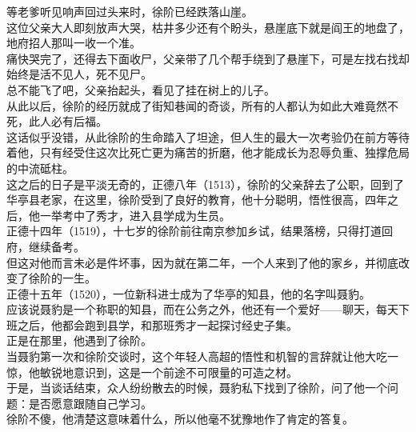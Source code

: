 \begin{multicols}{\theparacolNo}
等老爹听见响声回过头来时，徐阶已经跌落山崖。\\

这位父亲大人即刻放声大哭，枯井多少还有个盼头，悬崖底下就是阎王的地盘了，地府招人那叫一收一个准。\\

痛快哭完了，还得去下面收尸，父亲带了几个帮手绕到了悬崖下，可是左找右找却始终是活不见人，死不见尸。\\

总不能飞了吧，父亲抬起头，看见了挂在树上的儿子。\\

从此以后，徐阶的经历就成了街知巷闻的奇谈，所有的人都认为如此大难竟然不死，此人必有后福。\\

这话似乎没错，从此徐阶的生命踏入了坦途，但人生的最大一次考验仍在前方等待着他，只有经受住这次比死亡更为痛苦的折磨，他才能成长为忍辱负重、独撑危局的中流砥柱。\\

这之后的日子是平淡无奇的，正德八年（1513），徐阶的父亲辞去了公职，回到了华亭县老家，在这里，徐阶受到了良好的教育，他十分聪明，悟性很高，四年之后，他一举考中了秀才，进入县学成为生员。\\

正德十四年（1519），十七岁的徐阶前往南京参加乡试，结果落榜，只得打道回府，继续备考。\\

但这对他而言未必是件坏事，因为就在第二年，一个人来到了他的家乡，并彻底改变了徐阶的一生。\\

正德十五年（1520），一位新科进士成为了华亭的知县，他的名字叫聂豹。\\

应该说聂豹是一个称职的知县，而在公务之外，他还有一个爱好——聊天，每天下班之后，他都会跑到县学，和那班秀才一起探讨经史子集。\\

正是在那里，他遇到了徐阶。\\

当聂豹第一次和徐阶交谈时，这个年轻人高超的悟性和机智的言辞就让他大吃一惊，他敏锐地意识到，这是一个前途不可限量的可造之材。\\

于是，当谈话结束，众人纷纷散去的时候，聂豹私下找到了徐阶，问了他一个问题：是否愿意跟随自己学习。\\

徐阶不傻，他清楚这意味着什么，所以他毫不犹豫地作了肯定的答复。\\


\end{multicols}

